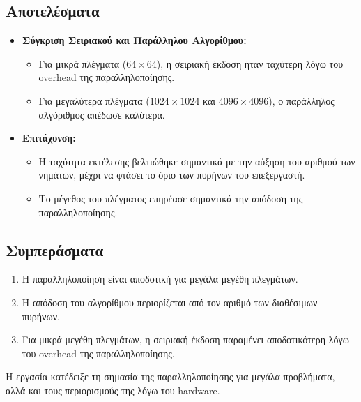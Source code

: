 \documentclass{article}
\begin{document}
\subsection*{Αποτελέσματα}
\begin{itemize}
    \item \textbf{Σύγκριση Σειριακού και Παράλληλου Αλγορίθμου:}
    \begin{itemize}
        \item Για μικρά πλέγματα ($64 \times 64$), η σειριακή έκδοση ήταν ταχύτερη λόγω του overhead της παραλληλοποίησης.
        \item Για μεγαλύτερα πλέγματα ($1024 \times 1024$ και $4096 \times 4096$), ο παράλληλος αλγόριθμος απέδωσε καλύτερα.
    \end{itemize}
    \item \textbf{Επιτάχυνση:}
    \begin{itemize}
        \item Η ταχύτητα εκτέλεσης βελτιώθηκε σημαντικά με την αύξηση του αριθμού των νημάτων, μέχρι να φτάσει το όριο των πυρήνων του επεξεργαστή.
        \item Το μέγεθος του πλέγματος επηρέασε σημαντικά την απόδοση της παραλληλοποίησης.
    \end{itemize}
\end{itemize}
\subsection*{Συμπεράσματα}
\begin{enumerate}
    \item Η παραλληλοποίηση είναι αποδοτική για μεγάλα μεγέθη πλεγμάτων.
    \item Η απόδοση του αλγορίθμου περιορίζεται από τον αριθμό των διαθέσιμων πυρήνων.
    \item Για μικρά μεγέθη πλεγμάτων, η σειριακή έκδοση παραμένει αποδοτικότερη λόγω του overhead της παραλληλοποίησης.
\end{enumerate}
Η εργασία κατέδειξε τη σημασία της παραλληλοποίησης για μεγάλα προβλήματα, αλλά και τους περιορισμούς της λόγω του hardware.
\end{document}
